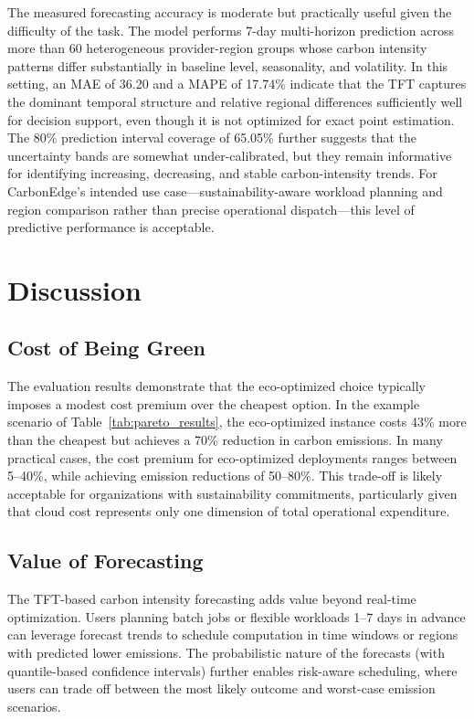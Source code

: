 \documentclass[12pt]{article}
\begin{document}
The measured forecasting accuracy is moderate but practically useful given the difficulty of the task. The model performs 7-day multi-horizon prediction across more than 60 heterogeneous provider-region groups whose carbon intensity patterns differ substantially in baseline level, seasonality, and volatility. In this setting, an MAE of 36.20 and a MAPE of 17.74\% indicate that the TFT captures the dominant temporal structure and relative regional differences sufficiently well for decision support, even though it is not optimized for exact point estimation. The 80\% prediction interval coverage of 65.05\% further suggests that the uncertainty bands are somewhat under-calibrated, but they remain informative for identifying increasing, decreasing, and stable carbon-intensity trends. For CarbonEdge's intended use case---sustainability-aware workload planning and region comparison rather than precise operational dispatch---this level of predictive performance is acceptable.


\section{Discussion}

\subsection{Cost of Being Green}

The evaluation results demonstrate that the eco-optimized choice typically imposes a modest cost premium over the cheapest option. In the example scenario of Table~\ref{tab:pareto_results}, the eco-optimized instance costs 43\% more than the cheapest but achieves a 70\% reduction in carbon emissions. In many practical cases, the cost premium for eco-optimized deployments ranges between 5--40\%, while achieving emission reductions of 50--80\%. This trade-off is likely acceptable for organizations with sustainability commitments, particularly given that cloud cost represents only one dimension of total operational expenditure.

\subsection{Value of Forecasting}

The TFT-based carbon intensity forecasting adds value beyond real-time optimization. Users planning batch jobs or flexible workloads 1--7 days in advance can leverage forecast trends to schedule computation in time windows or regions with predicted lower emissions. The probabilistic nature of the forecasts (with quantile-based confidence intervals) further enables risk-aware scheduling, where users can trade off between the most likely outcome and worst-case emission scenarios.
\end{document}
